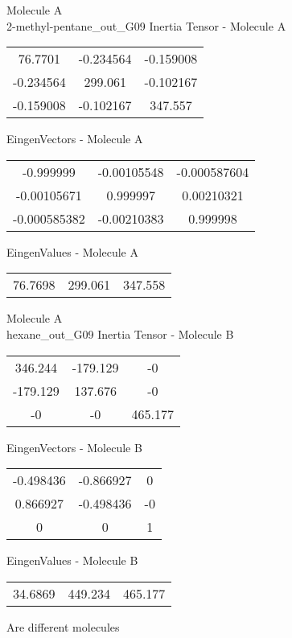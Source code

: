 \newpage
\begin{multicols}{2}
\begin{center}
Molecule A \\ 
2-methyl-pentane_out_G09
Inertia Tensor - Molecule A \\
\vtab
\begin{tabular}{|c c c|}
76.7701	 & 	-0.234564	 & 	-0.159008	 \\
-0.234564	 & 	299.061	 & 	-0.102167	 \\
-0.159008	 & 	-0.102167	 & 	347.557
\end{tabular}

\vtab
 EingenVectors - Molecule A     \\
\vtab
\begin{tabular}{|c c c|}
-0.999999	 & 	-0.00105548	 & 	-0.000587604	 \\
-0.00105671	 & 	0.999997	 & 	0.00210321	 \\
-0.000585382	 & 	-0.00210383	 & 	0.999998
\end{tabular}

\vtab
 EingenValues - Molecule A     \\
\vtab
\begin{tabular}{|c c c|}
76.7698	 & 	299.061	 & 	347.558
\end{tabular}
\columnbreak
Molecule A \\ 
hexane_out_G09
Inertia Tensor - Molecule B \\
\vtab
\begin{tabular}{|c c c|}
346.244	 & 	-179.129	 & 	-0	 \\
-179.129	 & 	137.676	 & 	-0	 \\
-0	 & 	-0	 & 	465.177
\end{tabular}

\vtab
 EingenVectors - Molecule B     \\
\vtab
\begin{tabular}{|c c c|}
-0.498436	 & 	-0.866927	 & 	0	 \\
0.866927	 & 	-0.498436	 & 	-0	 \\
0	 & 	0	 & 	1
\end{tabular}

\vtab
 EingenValues - Molecule B     \\
\vtab
\begin{tabular}{|c c c|}
34.6869	 & 	449.234	 & 	465.177
\end{tabular}
\textcolor{NavyBlue}{\large Are different molecules}
\end{center}
\end{multicols}
